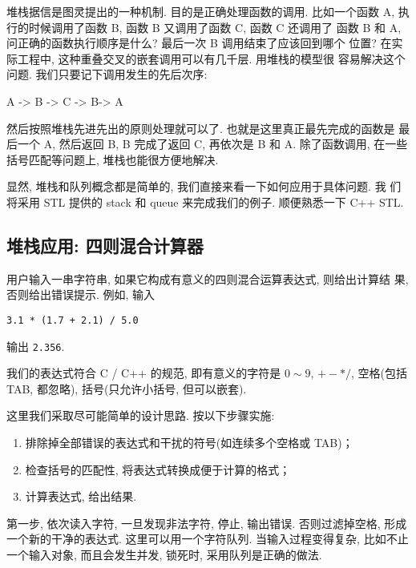 \documentclass[a4paper]{ctexart}
\theoremstyle{definition}
\theoremstyle{definition}
\begin{document}
堆栈据信是图灵提出的一种机制. 目的是正确处理函数的调用. 比如一个函数
A, 执行的时候调用了函数 B, 函数 B 又调用了函数 C, 函数 C 还调用了 函数
B 和 A, 问正确的函数执行顺序是什么? 最后一次 B 调用结束了应该回到哪个
位置? 在实际工程中, 这种重叠交叉的嵌套调用可以有几千层. 用堆栈的模型很
容易解决这个问题. 我们只要记下调用发生的先后次序:

\begin{center}
A -> B -> C -> B-> A
\end{center}

然后按照堆栈先进先出的原则处理就可以了. 也就是这里真正最先完成的函数是
最后一个 A, 然后返回 B, B 完成了返回 C, 再依次是 B 和 A. 除了函数调用,
在一些括号匹配等问题上, 堆栈也能很方便地解决.

显然, 堆栈和队列概念都是简单的, 我们直接来看一下如何应用于具体问题. 我
们将采用 STL 提供的 stack 和 queue 来完成我们的例子. 顺便熟悉一下 C++
STL.

\subsection{堆栈应用: 四则混合计算器}

用户输入一串字符串, 如果它构成有意义的四则混合运算表达式, 则给出计算结
果, 否则给出错误提示. 例如, 输入
\begin{verbatim}
3.1 * (1.7 + 2.1) / 5.0
\end{verbatim}
输出 \verb|2.356|. 

我们的表达式符合 C / C++ 的规范, 即有意义的字符是 $0 \sim 9$, $+ - *
/$, 空格(包括 TAB, 都忽略), 括号(只允许小括号, 但可以嵌套).

这里我们采取尽可能简单的设计思路. 按以下步骤实施:

\begin{enumerate}
\item 排除掉全部错误的表达式和干扰的符号(如连续多个空格或 TAB)；
\item 检查括号的匹配性, 将表达式转换成便于计算的格式；
\item 计算表达式, 给出结果.
\end{enumerate}

第一步, 依次读入字符, 一旦发现非法字符, 停止, 输出错误. 否则过滤掉空格,
形成一个新的干净的表达式. 这里可以用一个字符队列. 当输入过程变得复杂,
比如不止一个输入对象, 而且会发生并发, 锁死时, 采用队列是正确的做法.
\end{document}
